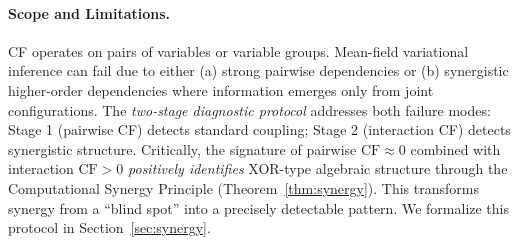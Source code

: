 \documentclass[10pt]{article} %
\theoremstyle{plain}
\theoremstyle{definition}
\newcommand{\CF}{\mathrm{CF}}
\begin{document}
\paragraph{Scope and Limitations.} CF operates on pairs of variables or variable groups. Mean-field variational inference can fail due to either (a) strong pairwise dependencies or (b) synergistic higher-order dependencies where information emerges only from joint configurations. The \emph{two-stage diagnostic protocol} addresses both failure modes: Stage 1 (pairwise CF) detects standard coupling; Stage 2 (interaction CF) detects synergistic structure. Critically, the signature of pairwise $\CF \approx 0$ combined with interaction $\CF > 0$ \emph{positively identifies} XOR-type algebraic structure through the Computational Synergy Principle (Theorem~\ref{thm:synergy}). This transforms synergy from a ``blind spot'' into a precisely detectable pattern. We formalize this protocol in Section~\ref{sec:synergy}.
\end{document}
